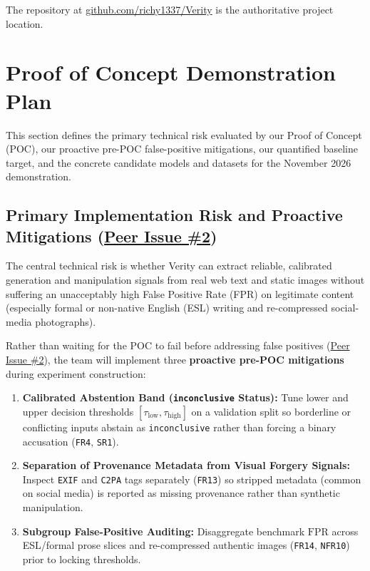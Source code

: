\documentclass{article}
\begin{document}
The repository at \href{https://github.com/richy1337/Verity}{github.com/richy1337/Verity} is the authoritative project location.

\section{Proof of Concept Demonstration Plan}

This section defines the primary technical risk evaluated by our Proof of Concept (POC), our proactive pre-POC false-positive mitigations, our quantified baseline target, and the concrete candidate models and datasets for the November 2026 demonstration.

\subsection{Primary Implementation Risk and Proactive Mitigations (\href{https://github.com/richy1337/Verity/issues/2}{Peer Issue \#2})}

The central technical risk is whether Verity can extract reliable, calibrated generation and manipulation signals from real web text and static images without suffering an unacceptably high False Positive Rate (FPR) on legitimate content (especially formal or non-native English (ESL) writing and re-compressed social-media photographs).

Rather than waiting for the POC to fail before addressing false positives (\href{https://github.com/richy1337/Verity/issues/2}{Peer Issue \#2}), the team will implement three \textbf{proactive pre-POC mitigations} during experiment construction:
\begin{enumerate}[leftmargin=*]
    \item \textbf{Calibrated Abstention Band (\texttt{inconclusive} Status):} Tune lower and upper decision thresholds $[\tau_{\text{low}}, \tau_{\text{high}}]$ on a validation split so borderline or conflicting inputs abstain as \texttt{inconclusive} rather than forcing a binary accusation (\texttt{FR4}, \texttt{SR1}).
    \item \textbf{Separation of Provenance Metadata from Visual Forgery Signals:} Inspect \texttt{EXIF} and \texttt{C2PA} tags separately (\texttt{FR13}) so stripped metadata (common on social media) is reported as missing provenance rather than synthetic manipulation.
    \item \textbf{Subgroup False-Positive Auditing:} Disaggregate benchmark $\text{FPR}$ across ESL/formal prose slices and re-compressed authentic images (\texttt{FR14}, \texttt{NFR10}) prior to locking thresholds.
\end{enumerate}
\end{document}

